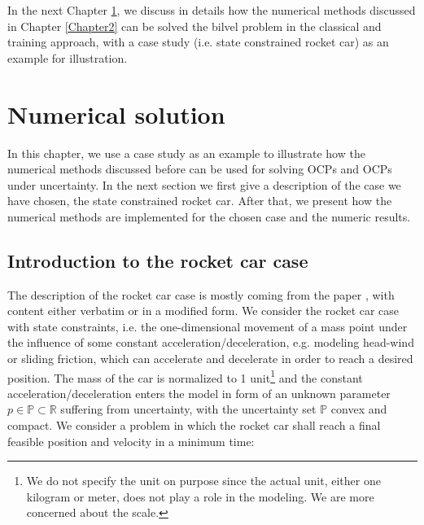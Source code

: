 \documentclass  [
  paper    = a4,
  BCOR     = 10mm,
  twoside,
  fontsize = 12pt,
  fleqn,
  toc      = bibnumbered,
  toc      = listofnumbered,
  numbers  = noendperiod,
  headings = normal,
  listof   = leveldown,
  version  = 3.03
]                                       {scrreprt}
\newcommand{\<}{\langle}
\renewcommand{\>}{\rangle}
\begin{document}
In the next Chapter \ref{Chapter4}, we discuss in details how the numerical methods discussed in Chapter \ref{Chapter2} can be solved the bilvel problem in the classical and training approach,  with a case study (i.e. state constrained rocket car) as an example for illustration. 

\chapter{Numerical solution}
\label{Chapter4}
In this chapter, we use a case study as an example to illustrate how the numerical methods discussed before can be used for solving OCPs and OCPs under uncertainty. In the next section we first give a description of the case we have chosen, the state constrained rocket car. After that, we present how the numerical methods are implemented for the chosen case and the numeric results.  

\section{Introduction to the rocket car case}

The description of the rocket car case is mostly coming from the paper \cite{MatSch22}, with content either verbatim or in a modified form. We consider the rocket car case with state constraints, i.e. the one-dimensional movement of a mass point under the influence of some constant acceleration/deceleration, e.g. modeling head-wind or sliding friction, which can accelerate and decelerate in order to reach a desired position. The mass of the car is normalized to 1 unit\footnote{We do not specify the unit on purpose since the actual unit, either one kilogram or meter, does not play a role in the modeling. We are more concerned about the scale.} and the constant acceleration/deceleration enters the model in form of an unknown parameter $p \in  \mathbb{P} \subset \mathbb{R}$ suffering from uncertainty, with the uncertainty set $ \mathbb{P}$ convex and compact. We consider a problem in which the rocket car shall reach a final feasible position and velocity in a minimum time: 
\end{document}
